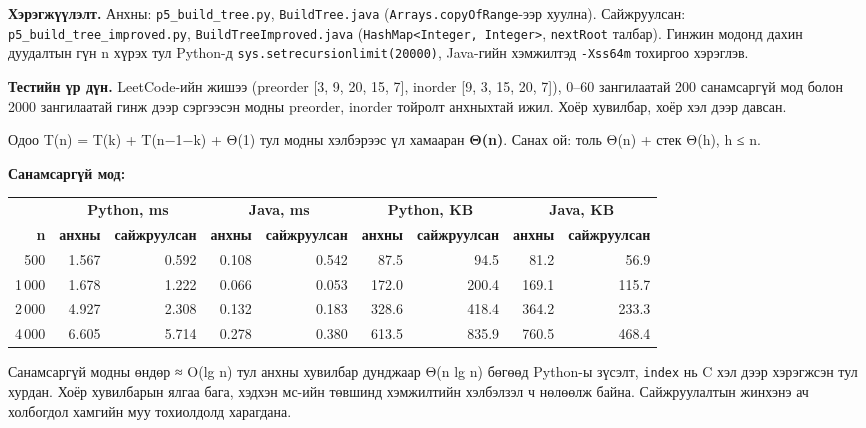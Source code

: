 \documentclass[11pt,a4paper]{article}
\begin{document}
\textbf{Хэрэгжүүлэлт.} Анхны: \texttt{p5\_\allowbreak{}build\_\allowbreak{}tree.\allowbreak{}py}, \texttt{BuildTree.\allowbreak{}java} (\texttt{Arrays.\allowbreak{}copyOfRange}-ээр хуулна). Сайжруулсан: \texttt{p5\_\allowbreak{}build\_\allowbreak{}tree\_\allowbreak{}improved.\allowbreak{}py}, \texttt{BuildTreeImproved.\allowbreak{}java} (\texttt{HashMap<Integer, Integer>}, \texttt{nextRoot} талбар). Гинжин модонд дахин дуудалтын гүн n хүрэх тул Python-д \texttt{sys.\allowbreak{}setrecursionlimit(20000)}, Java-гийн хэмжилтэд \texttt{-Xss64m} тохиргоо хэрэглэв.

\textbf{Тестийн үр дүн.} LeetCode-ийн жишээ (preorder [3, 9, 20, 15, 7], inorder [9, 3, 15, 20, 7]), 0–60 зангилаатай 200 санамсаргүй мод болон 2000 зангилаатай гинж дээр сэргээсэн модны preorder, inorder тойролт анхныхтай ижил. Хоёр хувилбар, хоёр хэл дээр давсан.

Одоо T(n) = T(k) + T(n−1−k) + Θ(1) тул модны хэлбэрээс үл хамааран \textbf{Θ(n)}. Санах ой: толь Θ(n) + стек Θ(h), h ≤ n.

\textbf{Санамсаргүй мод:}

\begin{center}
\scriptsize
\setlength{\tabcolsep}{4pt}
\begin{tabular}{rrrrrrrrr}
\toprule
\multicolumn{1}{c}{} & \multicolumn{2}{c}{\textbf{Python, ms}} & \multicolumn{2}{c}{\textbf{Java, ms}} & \multicolumn{2}{c}{\textbf{Python, KB}} & \multicolumn{2}{c}{\textbf{Java, KB}} \\
\cmidrule(lr){2-3} \cmidrule(lr){4-5} \cmidrule(lr){6-7} \cmidrule(lr){8-9}
\textbf{n} & \textbf{анхны} & \textbf{сайжруулсан} & \textbf{анхны} & \textbf{сайжруулсан} & \textbf{анхны} & \textbf{сайжруулсан} & \textbf{анхны} & \textbf{сайжруулсан} \\
\midrule
500 & 1.567 & 0.592 & 0.108 & 0.542 & 87.5 & 94.5 & 81.2 & 56.9 \\
1\,000 & 1.678 & 1.222 & 0.066 & 0.053 & 172.0 & 200.4 & 169.1 & 115.7 \\
2\,000 & 4.927 & 2.308 & 0.132 & 0.183 & 328.6 & 418.4 & 364.2 & 233.3 \\
4\,000 & 6.605 & 5.714 & 0.278 & 0.380 & 613.5 & 835.9 & 760.5 & 468.4 \\
\bottomrule
\end{tabular}
\end{center}

Санамсаргүй модны өндөр ≈ O(lg n) тул анхны хувилбар дунджаар Θ(n lg n) бөгөөд Python-ы зүсэлт, \texttt{index} нь C хэл дээр хэрэгжсэн тул хурдан. Хоёр хувилбарын ялгаа бага, хэдхэн мс-ийн төвшинд хэмжилтийн хэлбэлзэл ч нөлөөлж байна. Сайжруулалтын жинхэнэ ач холбогдол хамгийн муу тохиолдолд харагдана.
\end{document}
